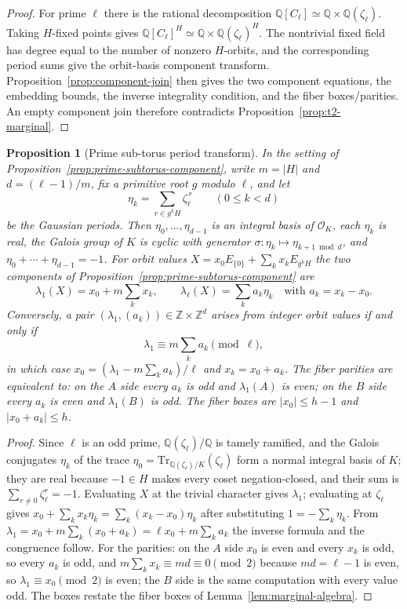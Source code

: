 \documentclass[11pt]{article}
\theoremstyle{plain}
\newtheorem{proposition}[theorem]{Proposition}
\theoremstyle{definition}
\theoremstyle{remark}
\newcommand{\Z}{\mathbb Z}
\newcommand{\Q}{\mathbb Q}
\begin{document}
\begin{proof}
For prime $\ell$ there is the rational decomposition
$\Q[C_\ell]\simeq \Q\times\Q(\zeta_\ell)$.  Taking $H$-fixed points gives
$\Q[C_\ell]^H\simeq\Q\times\Q(\zeta_\ell)^H$.  The nontrivial fixed field has
degree equal to the number of nonzero $H$-orbits, and the corresponding period
sums give the orbit-basis component transform.  Proposition~\ref{prop:component-join}
then gives the two component equations, the embedding bounds, the inverse
integrality condition, and the fiber boxes/parities.  An empty component join
therefore contradicts Proposition~\ref{prop:t2-marginal}.
\end{proof}

\begin{proposition}[Prime sub-torus period transform]\label{prop:prime-subtorus-periods}
In the setting of Proposition~\ref{prop:prime-subtorus-component}, write
$m=|H|$ and $d=(\ell-1)/m$, fix a primitive root $g$ modulo $\ell$, and let
\[
  \eta_k=\sum_{r\in g^kH}\zeta_\ell^{\,r}\qquad(0\le k<d)
\]
be the Gaussian periods.  Then $\eta_0,\dots,\eta_{d-1}$ is an integral basis
of $\mathcal O_K$, each $\eta_k$ is real, the Galois group of $K$ is cyclic
with generator $\sigma\colon\eta_k\mapsto\eta_{k+1\bmod d}$, and
$\eta_0+\cdots+\eta_{d-1}=-1$.  For orbit values
$X=x_0E_{\{0\}}+\sum_kx_kE_{g^kH}$ the two components of
Proposition~\ref{prop:prime-subtorus-component} are
\[
  \lambda_1(X)=x_0+m\sum_kx_k,
  \qquad
  \lambda_\ell(X)=\sum_ka_k\eta_k
  \quad\text{with }a_k=x_k-x_0 .
\]
Conversely, a pair $(\lambda_1,(a_k))\in\Z\times\Z^d$ arises from integer
orbit values if and only if
\[
  \lambda_1\equiv m\sum_ka_k\pmod\ell,
\]
in which case $x_0=(\lambda_1-m\sum_ka_k)/\ell$ and $x_k=x_0+a_k$.  The fiber
parities are equivalent to: on the $A$ side every $a_k$ is odd and
$\lambda_1(A)$ is even; on the $B$ side every $a_k$ is even and $\lambda_1(B)$
is odd.  The fiber boxes are $|x_0|\le h-1$ and $|x_0+a_k|\le h$.
\end{proposition}

\begin{proof}
Since $\ell$ is an odd prime, $\Q(\zeta_\ell)/\Q$ is tamely ramified, and the
Galois conjugates $\eta_k$ of the trace $\eta_0=\mathrm{Tr}_{\Q(\zeta_\ell)/K}
(\zeta_\ell)$ form a normal integral basis of $K$; they are real because
$-1\in H$ makes every coset negation-closed, and their sum is
$\sum_{r\ne0}\zeta_\ell^r=-1$.  Evaluating $X$ at the trivial character gives
$\lambda_1$; evaluating at $\zeta_\ell$ gives $x_0+\sum_kx_k\eta_k=
\sum_k(x_k-x_0)\eta_k$ after substituting $1=-\sum_k\eta_k$.  From
$\lambda_1=x_0+m\sum_k(x_0+a_k)=\ell x_0+m\sum_ka_k$ the inverse formula and
the congruence follow.  For the parities: on the $A$ side $x_0$ is even and
every $x_k$ is odd, so every $a_k$ is odd, and
$m\sum_kx_k\equiv md\equiv0\pmod2$ because $md=\ell-1$ is even, so
$\lambda_1\equiv x_0\pmod 2$ is even; the $B$ side is the same computation
with every value odd.  The boxes restate the fiber boxes of
Lemma~\ref{lem:marginal-algebra}.
\end{proof}
\end{document}
